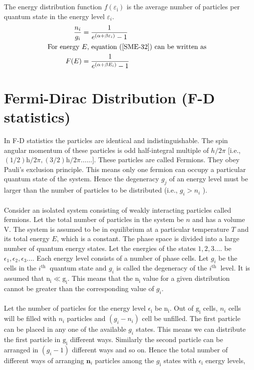 \section{}
The energy distribution function $f\left(\varepsilon_{\mathrm{i}}\right)$ is the average number of particles per quantum state in the energy level $\varepsilon_{i}$.
\begin{align}
\frac{n_{i}}{g_{i}}&=\frac{1}{e^{\left(\alpha+\beta \varepsilon_{i}\right)}-1}\label{SME-32}\\
\text { For energy } &E \text {, equation (\ref{SME-32}) can be written as }\notag\\
F(E)&=\frac{1}{e^{\left(\alpha+\beta E_{i}\right)}-1}\notag
\end{align}
\section{Fermi-Dirac Distribution (F-D statistics)}
In F-D statistics the particles are identical and indistinguishable. The spin angular momentum of these particles is odd half-integral multiple of $h / 2 \pi$ [i.e., $(1 / 2) \mathrm{h} / 2 \pi,(3 / 2) \mathrm{h} / 2 \pi \ldots \ldots]$. These particles are called Fermions. They obey Pauli's exclusion principle. This means only one fermion can occupy a particular quantum state of the system. Hence the degeneracy $g_{j}$ of an energy level must be larger than the number of particles to be distributed (i.e., $g_{i}>n_{i}$ ).\\\\
Consider an isolated system consisting of weakly interacting particles called fermions. Let the total number of particles in the system be $n$ and has a volume $\mathrm{V}$. The system is assumed to be in equilibrium at a particular temperature $T$ and its total energy $E$, which is a constant. The phase space is divided into a large number of quantum energy states. Let the energies of the states $1,2,3 \ldots .$ be $\epsilon_{1}, \epsilon_{2}, \epsilon_{3} \ldots$. Each energy level consists of a number of phase cells. Let $g_{i}$ be the cells in the $i^{\text {th }}$ quantum state and $g_{i}$ is called the degeneracy of the $i^{\text {th }}$ level. It is assumed that $\mathrm{n}_{\mathrm{i}} \ll \mathrm{g}_{\mathrm{i}}$. This means that the $\mathrm{n}_{\mathrm{i}}$ value for a given distribution cannot be greater than the corresponding value of $g_{i}$.\\\\
Let the number of particles for the energy level $\epsilon_{\mathrm{i}}$ be $\mathrm{n}_{\mathrm{i}}$. Out of $\mathrm{g}_{\mathrm{i}}$ cells, $n_{i}$ cells will be filled with $n_{i}$ particles and $\left(g_{i}-n_{i}\right)$ cell be unfilled. The first particle can be placed in any one of the available $g_{i}$ states. This means we can distribute the first particle in $\mathrm{g}_{\mathrm{i}}$ different ways. Similarly the second particle can be arranged in $\left(g_{i}-1\right)$ different ways and so on. Hence the total number of different ways of arranging $\mathbf{n}_{i}$ particles among the $g_{\mathrm{i}}$ states with $\epsilon_{\mathrm{i}}$ energy levels,
